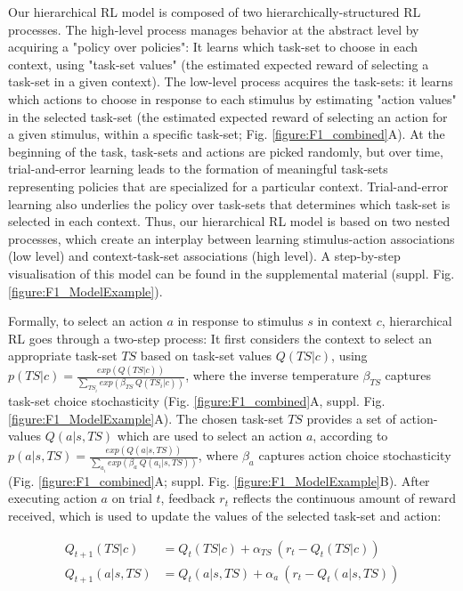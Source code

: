 \documentclass[10pt,letterpaper]{article}  %
\begin{document}
Our hierarchical RL model is composed of two hierarchically-structured RL processes. The high-level process manages behavior at the abstract level by acquiring a "policy over policies": It learns which task-set to choose in each context, using "task-set values" (the estimated expected reward of selecting a task-set in a given context). The low-level process acquires the task-sets: it learns which actions to choose in response to each stimulus by estimating "action values" in the selected task-set (the estimated expected reward of selecting an action for a given stimulus, within a specific task-set; Fig. \ref{figure:F1_combined}A).
At the beginning of the task, task-sets and actions are picked randomly, but over time, trial-and-error learning leads to the formation of meaningful task-sets representing policies that are specialized for a particular context. Trial-and-error learning also underlies the policy over task-sets that determines which task-set is selected in each context.
Thus, our hierarchical RL model is based on two nested processes, which create an interplay between learning stimulus-action associations (low level) and context-task-set associations (high level). A step-by-step visualisation of this model can be found in the supplemental material (suppl. Fig. \ref{figure:F1_ModelExample}).

Formally, to select an action $a$ in response to stimulus $s$ in context $c$, hierarchical RL goes through a two-step process: It first considers the context to select an appropriate task-set $TS$ based on task-set values $Q(TS|c)$, using
$p(TS|c) = \frac{exp(Q(TS|c))}{\sum_{TS_i} exp(\beta_{TS}\ Q(TS_i|c))}$, where
the inverse temperature $\beta_{TS}$ captures task-set choice stochasticity (Fig. \ref{figure:F1_combined}A, suppl. Fig. \ref{figure:F1_ModelExample}A). The chosen task-set $TS$ provides a set of action-values $Q(a|s,TS)$ which are used to select an action $a$, according to
$p(a|s,TS) = \frac{exp(Q(a|s,TS))}{\sum_{a_i} exp(\beta_a\ Q(a_i|s,TS))}$, where
$\beta_{a}$ captures action choice stochasticity (Fig. \ref{figure:F1_combined}A; suppl. Fig. \ref{figure:F1_ModelExample}B). After executing action $a$ on trial $t$, feedback $r_t$ reflects the continuous amount of reward received, which is used to update the values of the selected task-set and action:

\begin{align*}
    Q_{t+1}(TS|c) &= Q_t(TS|c) + \alpha_{TS}\ (r_t - Q_t(TS|c)) \\
    Q_{t+1}(a|s,TS) &= Q_t(a|s,TS) + \alpha_a\ (r_t - Q_t(a|s,TS))
\end{align*}
\end{document}
